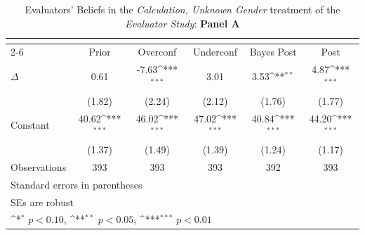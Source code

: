 \begin{table}[htbp]\centering
\def\sym#1{\ifmmode^{#1}\else\(^{#1}\)\fi}
\caption{Evaluators' Beliefs in the \textit{Calculation, Unknown Gender} treatment of the \textit{Evaluator Study}: \textbf{Panel A}}
\begin{tabular}{l*{5}{c}}
\hline\hline
                &\multicolumn{5}{c}{}                                                                          \\\cmidrule(lr){2-6}
                &\multicolumn{1}{c}{Prior}&\multicolumn{1}{c}{Overconf}&\multicolumn{1}{c}{Underconf}&\multicolumn{1}{c}{Bayes Post}&\multicolumn{1}{c}{Post}\\
\hline
$\Delta$        &     0.61         &    -7.63\sym{***}&     3.01         &     3.53\sym{**} &     4.87\sym{***}\\
                &   (1.82)         &   (2.24)         &   (2.12)         &   (1.76)         &   (1.77)         \\
Constant        &    40.62\sym{***}&    46.02\sym{***}&    47.02\sym{***}&    40.84\sym{***}&    44.20\sym{***}\\
                &   (1.37)         &   (1.49)         &   (1.39)         &   (1.24)         &   (1.17)         \\
\hline
Observations    &      393         &      393         &      393         &      392         &      393         \\
\hline\hline
\multicolumn{6}{l}{\footnotesize Standard errors in parentheses}\\
\multicolumn{6}{l}{\footnotesize SEs are robust}\\
\multicolumn{6}{l}{\footnotesize \sym{*} \(p<0.10\), \sym{**} \(p<0.05\), \sym{***} \(p<0.01\)}\\
\end{tabular}
\end{table}

